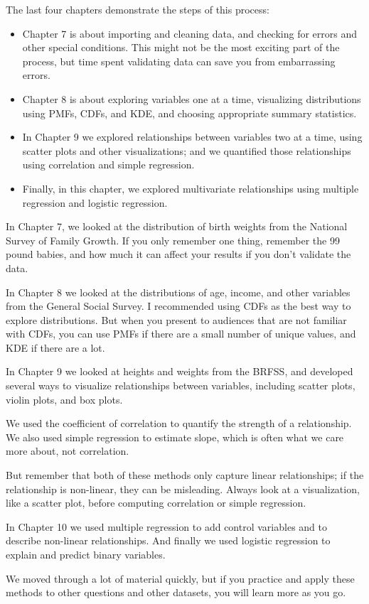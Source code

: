 The last four chapters demonstrate the steps of this process:

\begin{itemize}
\item
  Chapter 7 is about importing and cleaning data, and checking for
  errors and other special conditions. This might not be the most
  exciting part of the process, but time spent validating data can save
  you from embarrassing errors.
\item
  Chapter 8 is about exploring variables one at a time, visualizing
  distributions using PMFs, CDFs, and KDE, and choosing appropriate
  summary statistics.
\item
  In Chapter 9 we explored relationships between variables two at a
  time, using scatter plots and other visualizations; and we quantified
  those relationships using correlation and simple regression.
\item
  Finally, in this chapter, we explored multivariate relationships using
  multiple regression and logistic regression.
\end{itemize}

In Chapter 7, we looked at the distribution of birth weights from the
National Survey of Family Growth. If you only remember one thing,
remember the 99 pound babies, and how much it can affect your results if
you don't validate the data.

In Chapter 8 we looked at the distributions of age, income, and other
variables from the General Social Survey. I recommended using CDFs as
the best way to explore distributions. But when you present to audiences
that are not familiar with CDFs, you can use PMFs if there are a small
number of unique values, and KDE if there are a lot.

In Chapter 9 we looked at heights and weights from the BRFSS, and
developed several ways to visualize relationships between variables,
including scatter plots, violin plots, and box plots.

We used the coefficient of correlation to quantify the strength of a
relationship. We also used simple regression to estimate slope, which is
often what we care more about, not correlation.

But remember that both of these methods only capture linear
relationships; if the relationship is non-linear, they can be
misleading. Always look at a visualization, like a scatter plot, before
computing correlation or simple regression.

In Chapter 10 we used multiple regression to add control variables and
to describe non-linear relationships. And finally we used logistic
regression to explain and predict binary variables.

We moved through a lot of material quickly, but if you practice and
apply these methods to other questions and other datasets, you will
learn more as you go.

